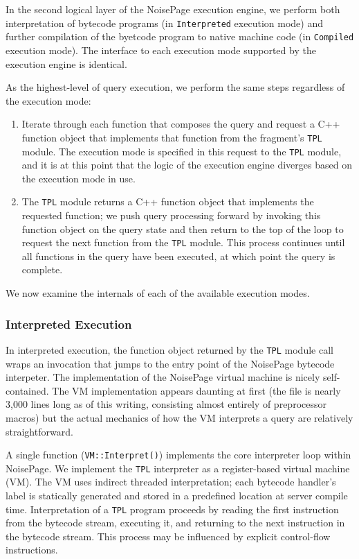 \documentclass{vldb}
\newcommand{\tpl}{\texttt{TPL}\xspace}
\begin{document}
In the second logical layer of the NoisePage execution engine, we perform both interpretation of bytecode programs (in \texttt{Interpreted} execution mode) and further compilation of the byetcode program to native machine code (in \texttt{Compiled} execution mode). The interface to each execution mode supported by the execution engine is identical.

As the highest-level of query execution, we perform the same steps regardless of the execution mode:

\begin{enumerate}
    \item Iterate through each function that composes the query and request a C++ function object that implements that function from the fragment's \tpl module. The execution mode is specified in this request to the \tpl module, and it is at this point that the logic of the execution engine diverges based on the execution mode in use.
    \item The \tpl module returns a C++ function object that implements the requested function; we push query processing forward by invoking this function object on the query state and then return to the top of the loop to request the next function from the \tpl module. This process continues until all functions in the query have been executed, at which point the query is complete.
\end{enumerate}

We now examine the internals of each of the available execution modes.

\subsubsection{Interpreted Execution}

In interpreted execution, the function object returned by the \tpl module call wraps an invocation that jumps to the entry point of the NoisePage bytecode interpeter. The implementation of the NoisePage virtual machine is nicely self-contained. The VM implementation appears daunting at first (the file is nearly 3,000 lines long as of this writing, consisting almost entirely of preprocessor macros) but the actual mechanics of how the VM interprets a query are relatively straightforward.

A single function (\texttt{VM::Interpret()}) implements the core interpreter loop within NoisePage. We implement the \tpl interpreter as a register-based virtual machine (VM). The VM uses indirect threaded interpretation; each bytecode handler's label is statically generated and stored in a predefined location at server compile time. Interpretation of a \tpl program proceeds by reading the first instruction from the bytecode stream, executing it, and returning to the next instruction in the bytecode stream. This process may be influenced by explicit control-flow instructions.
\end{document}
